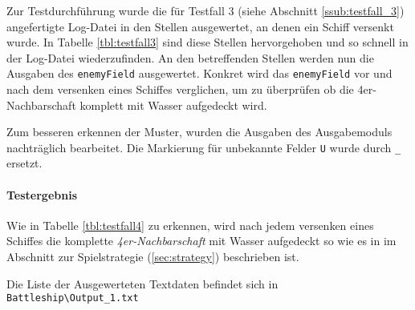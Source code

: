 		Zur Testdurchführung wurde die für Testfall 3 (siehe Abschnitt \ref{ssub:testfall_3}) angefertigte Log-Datei in den Stellen ausgewertet, an denen ein 
		Schiff versenkt wurde. In Tabelle \ref{tbl:testfall3} sind diese Stellen hervorgehoben und so schnell in der Log-Datei wiederzufinden.
		An den betreffenden Stellen werden nun die Ausgaben des \texttt{enemyField} ausgewertet. Konkret wird das \texttt{enemyField} vor und 
		nach dem versenken eines Schiffes verglichen, um zu überprüfen ob die 4er-Nachbarschaft komplett mit Wasser aufgedeckt wird.
		
		Zum besseren erkennen der Muster, wurden die Ausgaben des Ausgabemoduls nachträglich bearbeitet. Die Markierung für unbekannte Felder \texttt{U} wurde 
		durch \texttt{\_} ersetzt.
		\paragraph{Testergebnis} %
		\label{par:testergebnis}
			Wie in Tabelle \ref{tbl:testfall4} zu erkennen, wird nach jedem versenken eines Schiffes die komplette \emph{4er-Nachbarschaft} mit Wasser 
			aufgedeckt so wie es in im Abschnitt zur Spielstrategie (\ref{sec:strategy}) beschrieben ist.

			Die Liste der Ausgewerteten Textdaten befindet sich in \newline \texttt{Battleship\textbackslash Output\_1.txt}
    